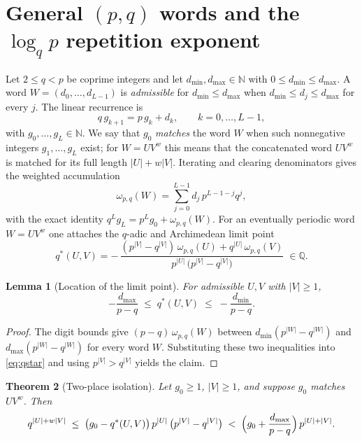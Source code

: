 \documentclass[11pt,a4paper]{article}
\newtheorem{theorem}{Theorem}[section]
\newtheorem{lemma}[theorem]{Lemma}
\theoremstyle{remark}
\newcommand{\Q}{\mathbb{Q}}
\newcommand{\N}{\mathbb{N}}
\begin{document}
\section{General \texorpdfstring{$(p,q)$}{(p,q)} words and the \texorpdfstring{$\log_q p$}{log\_q p} repetition exponent}
\label{sec:pq}

Let $2 \le q < p$ be coprime integers and let $d_{\min}, d_{\max} \in \N$ with $0 \le d_{\min} \le d_{\max}$. A word $W = (d_{0}, \dots, d_{L-1})$ is \emph{admissible} for $d_{\min} \le d_{\max}$ when $d_{\min} \le d_{j} \le d_{\max}$ for every $j$. The linear recurrence is
\begin{equation}
  q\, g_{k+1} = p\, g_{k} + d_{k}, \qquad k = 0, \dots, L-1,
\end{equation}
with $g_{0}, \dots, g_{L} \in \N$. We say that $g_{0}$ \emph{matches} the word $W$ when such nonnegative integers $g_{1}, \dots, g_{L}$ exist; for $W = U V^{w}$ this means that the concatenated word $U V^{w}$ is matched for its full length $|U| + w|V|$. Iterating and clearing denominators gives the weighted accumulation
\begin{equation}
  \omega_{p,q}(W) = \sum_{j=0}^{L-1} d_{j}\, p^{L-1-j} q^{j},
\end{equation}
with the exact identity $q^{L} g_{L} = p^{L} g_{0} + \omega_{p,q}(W)$. For an eventually periodic word $W = U V^{w}$ one attaches the $q$-adic and Archimedean limit point
\begin{equation}
  q^{*}(U,V) = -\,\frac{(p^{|V|} - q^{|V|})\, \omega_{p,q}(U) + q^{|U|}\, \omega_{p,q}(V)}
    {p^{|U|}\,\bigl(p^{|V|} - q^{|V|}\bigr)} \; \in \Q .
  \label{eq:qstar}
\end{equation}

\begin{lemma}[Location of the limit point]
\label{lem:qstar}
For admissible $U, V$ with $|V| \ge 1$,
\[
  -\frac{d_{\max}}{p-q} \;\le\; q^{*}(U,V) \;\le\; -\frac{d_{\min}}{p-q}.
\]
\end{lemma}

\begin{proof}
The digit bounds give $(p-q)\, \omega_{p,q}(W)$ between $d_{\min}(p^{|W|} - q^{|W|})$ and $d_{\max}(p^{|W|} - q^{|W|})$ for every word $W$. Substituting these two inequalities into \eqref{eq:qstar} and using $p^{|V|} > q^{|V|}$ yields the claim.
\end{proof}

\begin{theorem}[Two-place isolation]
\label{thm:isolation}
Let $g_{0} \ge 1$, $|V| \ge 1$, and suppose $g_{0}$ matches $U V^{w}$. Then
\begin{equation}
  q^{|U| + w|V|} \;\le\; \bigl(g_{0} - q^{*}(U,V)\bigr)\, p^{|U|}\, \bigl(p^{|V|} - q^{|V|}\bigr)
  \;<\; \Bigl(g_{0} + \frac{d_{\max}}{p-q}\Bigr)\, p^{|U| + |V|}.
  \label{eq:isolation}
\end{equation}
\end{theorem}
\end{document}
